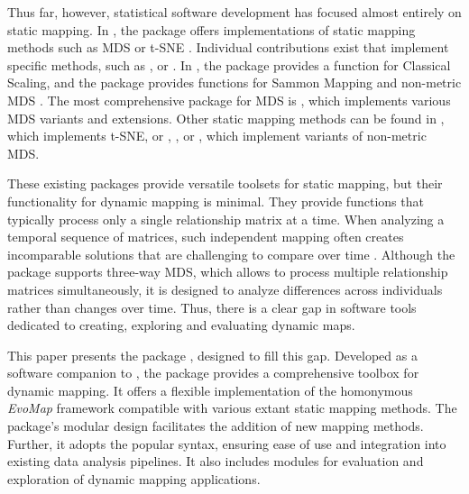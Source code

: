 \documentclass[article]{jss}
\begin{document}
Thus far, however, statistical software development has focused almost entirely on static mapping. 
In , the  package offers implementations of static mapping methods 
such as MDS or t-SNE \citep{Pedregosa+etal:2011}. Individual contributions exist that implement specific 
methods, such as  \citep{Perera:2023}, or  \citep{McInnes+Healy+Melville:2018}. 
In , the  package provides a function for Classical Scaling, and the  package
provides functions for Sammon Mapping and non-metric MDS \citep{Venables+Ripley:2002}. The
most comprehensive  package for MDS is  \citep{DeLeeuw+Mair:2009, Mair+Groenen+DeLeeuw:2022},
which implements various MDS variants and extensions. Other static mapping methods can be
found in  \citep{Krijthe:2015}, which implements t-SNE, or  \citep{Oksanen+etal:2022},
  \citep{Goslee+Urban:2007}, or  \citep{Le+Husson:2008}, which implement variants of 
 non-metric MDS.

 These existing packages provide versatile toolsets for static mapping, but their functionality for dynamic mapping is 
 minimal. They provide functions that typically process only a single relationship matrix at a time. 
When analyzing a temporal sequence of matrices, such independent mapping often creates incomparable solutions that are 
challenging to compare over time \citep{Matthe+Ringel+Skiera:2023}. 
Although the  package supports three-way MDS, which allows to process multiple relationship matrices 
simultaneously, it is designed to analyze differences across individuals rather than changes over time. 
Thus, there is a clear gap in software tools dedicated to creating, exploring and evaluating dynamic maps. 

This paper presents the  package , designed to fill this gap. Developed 
as a software companion to \cite{Matthe+Ringel+Skiera:2023}, the  package provides 
a comprehensive toolbox for dynamic mapping. It offers a flexible implementation of the 
homonymous \emph{EvoMap} framework compatible with various extant static mapping methods. 
The package's modular design facilitates the addition of new mapping methods. Further, it adopts the
popular  syntax, ensuring ease of use and integration into existing data analysis pipelines. 
It also includes modules for evaluation and exploration of dynamic mapping applications.
\end{document}
